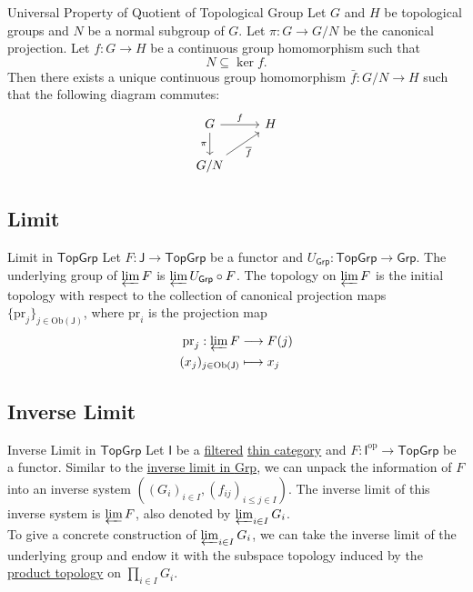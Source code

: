 \documentclass{report}
\begin{document}
\begin{proposition}{Universal Property of Quotient of Topological Group}{}
	Let $G$ and $H$ be topological groups and $N$ be a normal subgroup of $G$. Let $\pi:G\to G/N$ be the canonical projection. Let $f:G\to H$ be a continuous group homomorphism such that 
	\[
	N \subseteq \ker f.
	\]
	Then there exists a unique continuous group homomorphism $\bar{f}:G/N\to H$ such that the following diagram commutes:
	\[	\begin{tikzcd}
		G \arrow[r, "f"] \arrow[
d, "\pi"'] & H \\
		G/N  \arrow[ru, "\overline{f}"']&
	\end{tikzcd}
	\]
\end{proposition}

\subsection{Limit}
\begin{definition}{Limit in $\mathsf{TopGrp}$}{}
	Let $F:\mathsf{J}\to \mathsf{TopGrp}$ be a functor and $U_{\mathsf{Grp}}:\mathsf{TopGrp}\to \mathsf{Grp}$. The underlying group of $\varprojlim F$ is $\varprojlim  U_{\mathsf{Grp}}\circ F$. The topology on $\varprojlim F$ is the initial topology with respect to the collection of canonical projection maps $\{\mathrm{pr}_j\}_{j\in\mathrm{Ob}\left(\mathsf{J}\right)}$,  where $\mathrm{pr}_i$ is the projection map
	\begin{align*}
		\mathrm{pr}_j:\varprojlim F & \longrightarrow F(j) \\
		(x_j)_{j\in \mathrm{Ob}\left(\mathsf{J}\right)}  & \longmapsto x_j
	\end{align*}
\end{definition}



\subsection{Inverse Limit}
\begin{definition}{Inverse Limit in $\mathsf{TopGrp}$}{}
	Let $\mathsf{I}$ be a \hyperref[th:filtered_category]{filtered} \hyperref[th:thin_category]{thin category} and $F:\mathsf{I}^{\mathrm{op}}\to \mathsf{TopGrp}$ be a functor. Similar to the \hyperref[th:inverse_limit_of_groups]{inverse limit in \textsf{Grp}}, we can unpack the information of $F$ into an inverse system $\left(\left(G_i\right)_{i \in I},\left(f_{i j}\right)_{i \leq j \in I}\right)$. The inverse limit of this inverse system is $\varprojlim F$, also denoted by $\varprojlim_{i\in I}G_i$.\\
	To give a concrete construction of $\varprojlim_{i\in I}G_i$, we can take the inverse limit of the underlying group and endow it with the subspace topology induced by the \hyperref[th:product_topology]{product topology} on $\prod\limits_{i\in I}G_i$.
\end{definition}
\end{document}
